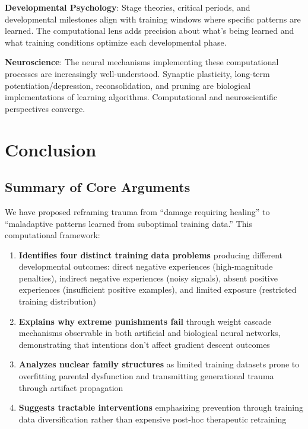 \documentclass{article}
\begin{document}
\textbf{Developmental Psychology}: Stage theories, critical periods, and developmental milestones align with training windows where specific patterns are learned. The computational lens adds precision about what's being learned and what training conditions optimize each developmental phase.

\textbf{Neuroscience}: The neural mechanisms implementing these computational processes are increasingly well-understood. Synaptic plasticity, long-term potentiation/depression, reconsolidation, and pruning are biological implementations of learning algorithms. Computational and neuroscientific perspectives converge.

\section{Conclusion}

\subsection{Summary of Core Arguments}

We have proposed reframing trauma from ``damage requiring healing'' to ``maladaptive patterns learned from suboptimal training data.'' This computational framework:

\begin{enumerate}
\item \textbf{Identifies four distinct training data problems} producing different developmental outcomes: direct negative experiences (high-magnitude penalties), indirect negative experiences (noisy signals), absent positive experiences (insufficient positive examples), and limited exposure (restricted training distribution)

\item \textbf{Explains why extreme punishments fail} through weight cascade mechanisms observable in both artificial and biological neural networks, demonstrating that intentions don't affect gradient descent outcomes

\item \textbf{Analyzes nuclear family structures} as limited training datasets prone to overfitting parental dysfunction and transmitting generational trauma through artifact propagation

\item \textbf{Suggests tractable interventions} emphasizing prevention through training data diversification rather than expensive post-hoc therapeutic retraining
\end{enumerate}
\end{document}
